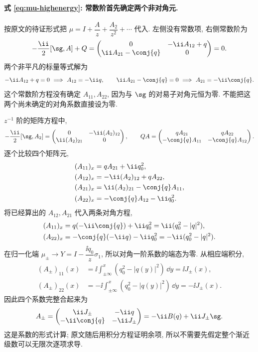 \paragraph{式 \eqref{eq:mu-highenergy}: 常数阶首先确定两个非对角元.}
按原文的待证形式把 $\mu=I+\dfrac{A}{z}+\dfrac{A_2}{z^2}+\cdots$ 代入.
左侧没有常数项, 右侧常数阶为
\[
-\dfrac{\ii}{2}[\sg,A]+Q
=\begin{pmatrix}
0&-\ii A_{12}+q\\
\ii A_{21}-\conj{q}&0
\end{pmatrix}=0.
\]
两个非平凡的标量等式解为
\[
-\ii A_{12}+q=0\ \Longrightarrow\ A_{12}=-\ii q,
\qquad
\ii A_{21}-\conj{q}=0\ \Longrightarrow\ A_{21}=-\ii\conj{q}.
\]
这个常数阶方程没有确定 $A_{11},A_{22}$,
因为与 $\sg$ 的对易子对角元恒为零.
不能把这两个尚未确定的对角系数直接设为零.

$z^{-1}$ 阶的矩阵方程中,
\[
-\dfrac{\ii}{2}[\sg,A_2]
=\begin{pmatrix}0&-\ii(A_2)_{12}\\
\ii(A_2)_{21}&0\end{pmatrix},
\qquad
QA=\begin{pmatrix}
qA_{21}&qA_{22}\\-\conj{q}A_{11}&-\conj{q}A_{12}
\end{pmatrix}.
\]
逐个比较四个矩阵元,
\begin{align*}
(A_{11})_x&=qA_{21}+\ii q_0^2,\\
(A_{12})_x&=-\ii(A_2)_{12}+qA_{22},\\
(A_{21})_x&=\ii(A_2)_{21}-\conj{q}A_{11},\\
(A_{22})_x&=-\conj{q}A_{12}-\ii q_0^2.
\end{align*}
将已经算出的 $A_{12},A_{21}$ 代入两条对角方程,
\begin{align*}
(A_{11})_x
&=q(-\ii\conj{q})+\ii q_0^2
=\ii(q_0^2-|q|^2),\\
(A_{22})_x
&=-\conj{q}(-\ii q)-\ii q_0^2
=-\ii(q_0^2-|q|^2).
\end{align*}
在归一化端 $\mu_\pm\to Y=I-\dfrac{\ii q_0}{z}\sigma_1$,
所以对角一阶系数的端态为零.
从相应端积分,
\begin{align*}
(A_\pm)_{11}(x)
&=\ii\int_{\pm\infty}^{x}(q_0^2-|q(y)|^2)\,\dd y
=\ii J_\pm(x),\\
(A_\pm)_{22}(x)
&=-\ii\int_{\pm\infty}^{x}(q_0^2-|q(y)|^2)\,\dd y
=-\ii J_\pm(x).
\end{align*}
因此四个系数完整合起来为
\[
A_\pm=\begin{pmatrix}
\ii J_\pm&-\ii q\\-\ii\conj{q}&-\ii J_\pm
\end{pmatrix}
=-\ii B(q)+\ii J_\pm\sg.
\]
这是系数的形式计算; 原文随后用积分方程证明余项,
所以不需要先假定整个渐近级数可以无限次逐项求导.

